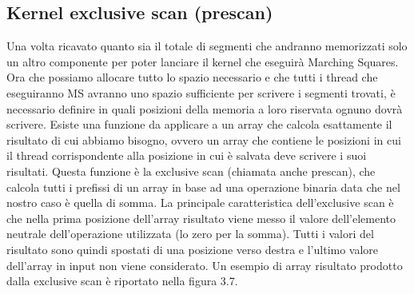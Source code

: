 \documentclass[12pt,a4paper]{report}
\begin{document}
\subsection{Kernel exclusive scan (prescan)}
Una volta ricavato quanto sia il totale di segmenti che andranno memorizzati solo un altro componente per poter lanciare il kernel che eseguirà Marching Squares. \newline
Ora che possiamo allocare tutto lo spazio necessario e che tutti i thread che eseguiranno MS avranno uno spazio sufficiente per scrivere i segmenti trovati, è necessario definire in quali posizioni della memoria a loro riservata ognuno dovrà scrivere. \newline
Esiste una funzione da applicare a un array che calcola esattamente il risultato di cui abbiamo bisogno, ovvero un array che contiene le posizioni in cui il thread corrispondente alla posizione in cui è salvata deve scrivere i suoi risultati.
Questa funzione è la exclusive scan (chiamata anche prescan), che calcola tutti i prefissi di un array in base ad una operazione binaria data che nel nostro caso è quella di somma. \newline
La principale caratteristica dell'exclusive scan è che nella prima posizione dell'array risultato viene messo il valore dell'elemento neutrale dell'operazione utilizzata (lo zero per la somma). Tutti i valori del risultato sono quindi spostati di una posizione verso destra e l'ultimo valore dell'array in input non viene considerato. Un esempio di array risultato prodotto dalla exclusive scan è riportato nella figura 3.7.
\end{document}
